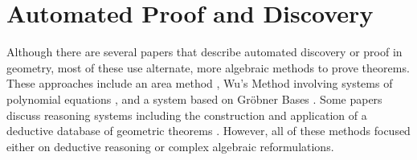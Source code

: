 \section{Automated Proof and Discovery}
Although there are several papers that describe automated discovery or
proof in geometry, most of these use alternate, more algebraic methods
to prove theorems.  These approaches include an area method
\cite{autoTools}, Wu's Method involving systems of polynomial
equations \cite{wuMethod}, and a system based on Gr\"obner Bases
\cite{grobner}.  Some papers discuss reasoning systems including the
construction and application of a deductive database of geometric
theorems \cite{deductiveDatabase}.  However, all of these methods
focused either on deductive reasoning or complex algebraic
reformulations.
